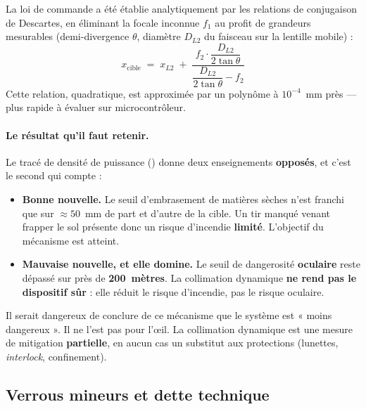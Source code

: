 \documentclass[11pt,a4paper]{article}
\begin{document}
La loi de commande a été établie analytiquement par les relations de conjugaison de
Descartes, en éliminant la focale inconnue $f_1$ au profit de grandeurs mesurables
(demi-divergence $\theta$, diamètre $D_{L2}$ du faisceau sur la lentille mobile) :
\[
  x_{\text{cible}} \;=\; x_{L2} \;+\;
  \frac{f_2 \cdot \dfrac{D_{L2}}{2\tan\theta}}
       {\dfrac{D_{L2}}{2\tan\theta} - f_2}
\]
Cette relation, quadratique, est approximée par un polynôme à $10^{-4}$~mm près — plus
rapide à évaluer sur microcontrôleur.

\paragraph{Le résultat qu'il faut retenir.} Le tracé de densité de puissance
() donne deux enseignements
\textbf{opposés}, et c'est le second qui compte :

\begin{itemize}
  \item \textcolor{vespagreen}{\textbf{Bonne nouvelle.}} Le seuil d'embrasement de matières
        sèches n'est franchi que sur $\approx 50$~mm de part et d'autre de la cible. Un tir
        manqué venant frapper le sol présente donc un risque d'incendie
        \textbf{limité}. L'objectif du mécanisme est atteint.
  \item \textcolor{vespared}{\textbf{Mauvaise nouvelle, et elle domine.}} Le seuil de
        dangerosité \textbf{oculaire} reste dépassé sur près de \textbf{200~mètres}. La
        collimation dynamique \textbf{ne rend pas le dispositif sûr} : elle réduit le risque
        d'incendie, pas le risque oculaire.
\end{itemize}

\begin{avertissement}
Il serait dangereux de conclure de ce mécanisme que le système est « moins dangereux ».
Il ne l'est pas pour l'\oe il. La collimation dynamique est une mesure de mitigation
\textbf{partielle}, en aucun cas un substitut aux protections (lunettes, \emph{interlock},
confinement).
\end{avertissement}

\subsection{Verrous mineurs et dette technique}
\end{document}
